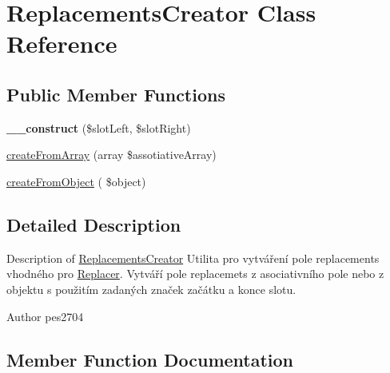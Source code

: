 \hypertarget{class_pes_1_1_slot_1_1_replacements_creator}{}\section{Replacements\+Creator Class Reference}
\label{class_pes_1_1_slot_1_1_replacements_creator}
\subsection*{Public Member Functions}
\begin{DoxyCompactItemize}
\item 
\mbox{\label{class_pes_1_1_slot_1_1_replacements_creator_a10b97abe25ad29223222b49048fd53eb}} 
{\bfseries \+\_\+\+\_\+construct} (\$slot\+Left, \$slot\+Right)
\item 
\mbox{\hyperlink{class_pes_1_1_slot_1_1_replacements_creator_a3fe43eb8955d537d4b1f34443a1d93da}{create\+From\+Array}} (array \$assotiative\+Array)
\item 
\mbox{\hyperlink{class_pes_1_1_slot_1_1_replacements_creator_a1257646460ed92c8cbcedd5ab45552c2}{create\+From\+Object}} ( \$object)
\end{DoxyCompactItemize}


\subsection{Detailed Description}
Description of \mbox{\hyperlink{class_pes_1_1_slot_1_1_replacements_creator}{Replacements\+Creator}} Utilita pro vytváření pole replacements vhodného pro \mbox{\hyperlink{class_pes_1_1_slot_1_1_replacer}{Replacer}}. Vytváří pole replacemets z asociativního pole nebo z objektu s použitím zadaných značek začátku a konce slotu.

\begin{DoxyAuthor}{Author}
pes2704 
\end{DoxyAuthor}


\subsection{Member Function Documentation}
\mbox{\label{class_pes_1_1_slot_1_1_replacements_creator_a3fe43eb8955d537d4b1f34443a1d93da}} 
